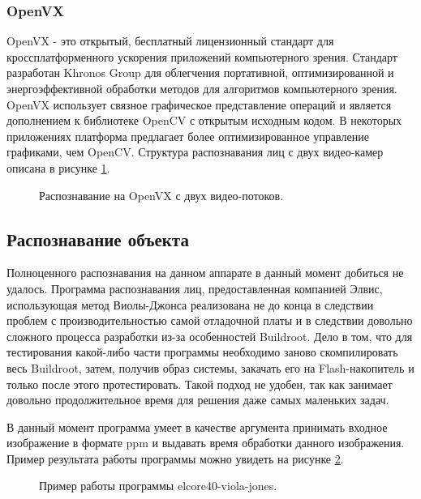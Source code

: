 \documentclass[14pt,a4paper]{scrartcl}
\begin{document}
		\subsubsection{OpenVX}
		
			OpenVX - это открытый, бесплатный лицензионный стандарт для кроссплатформенного ускорения приложений компьютерного зрения. Стандарт разработан Khronos Group для облегчения портативной, оптимизированной и энергоэффективной обработки методов для алгоритмов компьютерного зрения. OpenVX использует связное графическое представление операций и является дополнением к библиотеке OpenCV с открытым исходным кодом. В некоторых приложениях платформа предлагает более оптимизированное управление графиками, чем OpenCV\cite{bib:OpenVX_Wikipedia}. Структура распознавания лиц с двух видео-камер описана в рисунке \ref{fig:Stereo_Vision_OpenVX}\cite{bib:OpenVX_Habr}.
			
			\begin{figure}[h]
				\caption{Распознавание на OpenVX с двух видео-потоков.}
				\label{fig:Stereo_Vision_OpenVX}
			\end{figure}
			
	
	\subsection{Распознавание объекта}
	
		Полноценного распознавания на данном аппарате в данный момент добиться не удалось. Программа распознавания лиц, предоставленная компанией Элвис, использующая метод Виолы-Джонса реализована не до конца в следствии проблем с производительностью самой отладочной платы и в следствии довольно сложного процесса разработки из-за особенностей Buildroot. Дело в том, что для тестирования какой-либо части программы необходимо заново скомпилировать весь Buildroot, затем, получив образ системы, закачать его на Flash-накопитель и только после этого протестировать. Такой подход не удобен, так как занимает довольно продолжительное время для решения даже самых маленьких задач.
		
		В данный момент программа умеет в качестве аргумента принимать входное изображение в формате ppm и выдавать время обработки данного изображения. Пример результата работы программы можно увидеть на рисунке \ref{fig:Viola-Jones_Putty}.
		
		\begin{figure}[h]
			\caption{Пример работы программы elcore40-viola-jones.}
			\label{fig:Viola-Jones_Putty}
		\end{figure}
	
\end{document}
